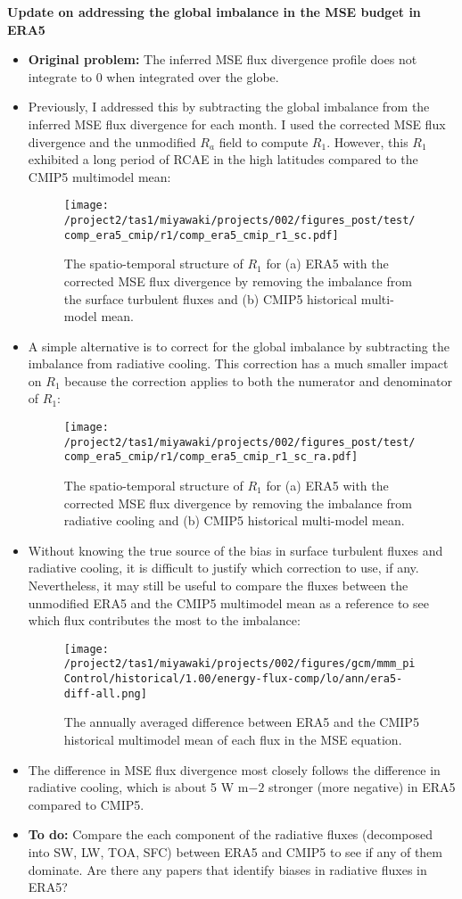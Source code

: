 \documentclass{article}
\begin{document}
\textbf{Update on addressing the global imbalance in the MSE budget in ERA5}
\begin{itemize}
  \item \textbf{Original problem:} The inferred MSE flux divergence profile does not integrate to 0 when integrated over the globe.
  \item Previously, I addressed this by subtracting the global imbalance from the inferred MSE flux divergence for each month. I used the corrected MSE flux divergence and the unmodified $R_{a}$ field to compute $R_{1}$. However, this  $R_{1}$ exhibited a long period of RCAE in the high latitudes compared to the CMIP5 multimodel mean:
        \begin{figure}[H]
          \texttt{[image: /project2/tas1/miyawaki/projects/002/figures\_post/test/comp\_era5\_cmip/r1/comp\_era5\_cmip\_r1\_sc.pdf]}
          \caption{The spatio-temporal structure of $R_{1}$ for (a) ERA5 with the corrected MSE flux divergence by removing the imbalance from the surface turbulent fluxes and (b) CMIP5 historical multi-model mean.}
        \end{figure}
  \item A simple alternative is to correct for the global imbalance by subtracting the imbalance from radiative cooling. This correction has a much smaller impact on $R_{1}$ because the correction applies to both the numerator and denominator of $R_{1}$:
        \begin{figure}[H]
          \texttt{[image: /project2/tas1/miyawaki/projects/002/figures\_post/test/comp\_era5\_cmip/r1/comp\_era5\_cmip\_r1\_sc\_ra.pdf]}
          \caption{The spatio-temporal structure of $R_{1}$ for (a) ERA5 with the corrected MSE flux divergence by removing the imbalance from radiative cooling and (b) CMIP5 historical multi-model mean.}
        \end{figure}
  \item Without knowing the true source of the bias in surface turbulent fluxes and radiative cooling, it is difficult to justify which correction to use, if any. Nevertheless, it may still be useful to compare the fluxes between the unmodified ERA5 and the CMIP5 multimodel mean as a reference to see which flux contributes the most to the imbalance:
        \begin{figure}[H]
          \texttt{[image: /project2/tas1/miyawaki/projects/002/figures/gcm/mmm\_piControl/historical/1.00/energy-flux-comp/lo/ann/era5-diff-all.png]}
          \caption{The annually averaged difference between ERA5 and the CMIP5 historical multimodel mean of each flux in the MSE equation.}
        \end{figure}
  \item The difference in MSE flux divergence most closely follows the difference in radiative cooling, which is about 5 W m${-2}$ stronger (more negative) in ERA5 compared to CMIP5.
  \item \textbf{To do:} Compare the each component of the radiative fluxes (decomposed into SW, LW, TOA, SFC) between ERA5 and CMIP5 to see if any of them dominate. Are there any papers that identify biases in radiative fluxes in ERA5?

\end{itemize}
\end{document}

